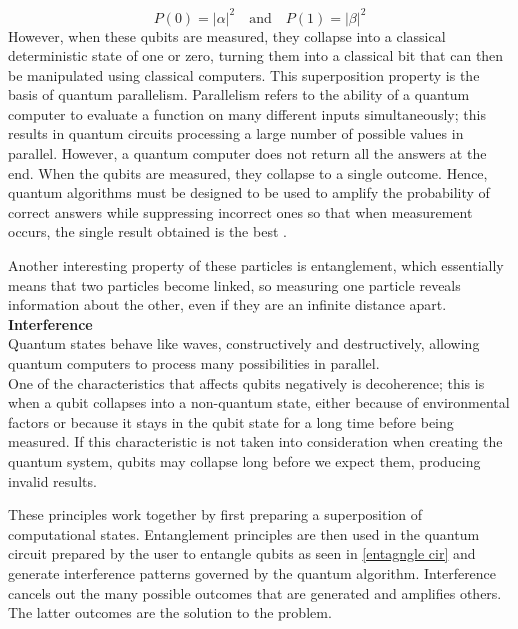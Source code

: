 \documentclass[a4paper]{report}
\begin{document}
{\begin{itemize}
\begin{equation}
    P(0) = |\alpha|^2 \quad \text{and} \quad P(1) = |\beta|^2
    \label{ch2:prob_equ}
\end{equation}
However, when these qubits are measured, they collapse into a classical deterministic state of one or zero, turning them into a classical bit that can then be manipulated using classical computers.
\newline 
This superposition property is the basis of quantum parallelism. Parallelism refers to the ability of a quantum computer to evaluate a function on many different inputs simultaneously; this results in quantum circuits processing a large number of possible values in parallel. However, a quantum computer does not return all the answers at the end. When the qubits are measured, they collapse to a single outcome. Hence, quantum algorithms must be designed to be used to amplify the probability of correct answers while suppressing incorrect ones so that when measurement occurs, the single result obtained is the best \cite{quantumparr}.

Another interesting property of these particles is entanglement, which essentially means that two particles become linked, so measuring one particle reveals information about the other, even if they are an infinite distance apart.
\\
    \textbf{Interference} \\ %
    Quantum states behave like waves, constructively and destructively, allowing quantum computers to process many possibilities in parallel.
\\
One of the characteristics that affects qubits negatively is decoherence; this is when a qubit collapses into a non-quantum state, either because of environmental factors or because it stays in the qubit state for a long time before being measured. If this characteristic is not taken into consideration when creating the quantum system, qubits may collapse long before we expect them, producing invalid results.

These principles work together by first preparing a superposition of computational states. Entanglement principles are then used in the quantum circuit prepared by the user to entangle qubits as seen in \ref{entagngle cir} and generate interference patterns governed by the quantum algorithm. Interference cancels out the many possible outcomes that are generated and amplifies others. The latter outcomes are the solution to the problem\cite{ibmQuantum}.


\end{itemize}}
\end{document}
